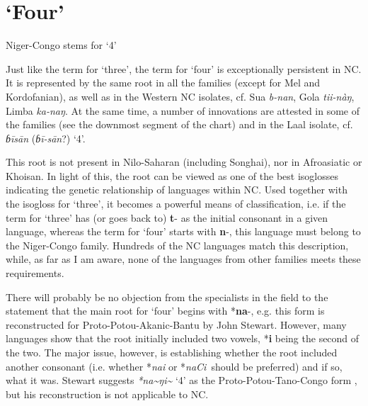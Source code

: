 \section{‘Four’}%
\begin{table}
\caption{\label{tab:4:13}Niger-Congo stems for `4'}
\kppyramid
{}




 
\end{table}

Just like the term for ‘three’, the term for ‘four’ is exceptionally persistent in NC. It is represented by the same root in all the families (except for Mel and Kordofanian), as well as in the Western NC isolates, cf. Sua \textit{b-nan}, Gola \textit{tii-nàŋ}, Limba \textit{ka-naŋ}. At the same time, a number of innovations are attested in some of the families (see the downmost segment of the chart) and in the Laal isolate, cf. \textit{ɓi\={}sa\={}n} (\textit{ɓi\={}-sa\={}n}?) ‘4’.

This root is not present in Nilo-Saharan (including Songhai), nor in Afroasiatic or Khoisan. In light of this, the root can be viewed as one of the best isoglosses indicating the genetic relationship of languages within NC. Used together with the isogloss for ‘three’, it becomes a powerful means of classification, i.e. if the term for ‘three’ has (or goes back to) \textbf{t}- as the initial consonant in a given language, whereas the term for ‘four’ starts with \textbf{n}-, this language must belong to the Niger-Congo family. Hundreds of the NC languages match this description, while, as far as I am aware, none of the languages from other families meets these requirements.

There will probably be no objection from the specialists in the field to the statement that the main root for ‘four’ begins with *\textbf{na}-, e.g. this form is reconstructed for Proto-Potou-Akanic-Bantu by John Stewart. However, many languages show that the root initially included two vowels, *\textbf{i} being the second of the two. The major issue, however, is establishing whether the root included another consonant (i.e. whether *\textit{nai} or *\textit{naCi~}should be preferred) and if so, what it was. Stewart suggests \textit{*na\~{}ŋi\~{}}  ‘4’ as the Proto-Potou-Tano-Congo form \citep{Stewart1983}, but his reconstruction is not applicable to NC.


